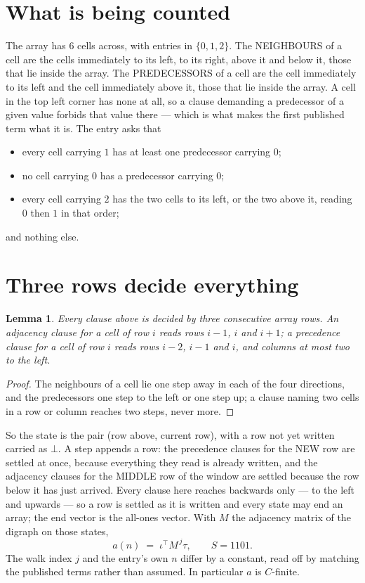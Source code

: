 \documentclass[11pt,a4paper]{article}
\theoremstyle{plain}
\newtheorem{lemma}[theorem]{Lemma}
\theoremstyle{definition}
\begin{document}
\section{What is being counted}

The array has $6$ cells across, with entries in $\{0,1,2\}$. The NEIGHBOURS of a cell are the
cells immediately to its left, to its right, above it and below it, those that lie inside the
array. The PREDECESSORS of a cell are the cell immediately to its left and the cell
immediately above it, those that lie inside the array. A cell in the top left corner has none
at all, so a clause demanding a predecessor of a given value forbids that value there --- which
is what makes the first published term what it is. The entry asks that
\begin{itemize}
\item every cell carrying $1$ has at least one predecessor carrying $0$;
\item no cell carrying $0$ has a predecessor carrying $0$;
\item every cell carrying $2$ has the two cells to its left, or the two above it, reading $0$ then $1$ in that order;
\end{itemize}
and nothing else.

\section{Three rows decide everything}

\begin{lemma}\label{lem:win}
Every clause above is decided by three consecutive array rows. An adjacency clause for a cell
of row $i$ reads rows $i-1$, $i$ and $i+1$; a precedence clause for a cell of row $i$ reads
rows $i-2$, $i-1$ and $i$, and columns at most two to the left.
\end{lemma}

\begin{proof}
The neighbours of a cell lie one step away in each of the four directions, and the predecessors
one step to the left or one step up; a clause naming two cells in a row or column reaches two
steps, never more.
\end{proof}

So the state is the pair (row above, current row), with a row not yet written carried as
$\bot$. A step appends a row: the precedence clauses for the NEW row are settled at once,
because everything they read is already written, and the adjacency clauses for the MIDDLE row
of the window are settled because the row below it has just arrived. Every clause here reaches backwards only --- to the left and upwards --- so a
row is settled as it is written and every state may end an array; the end vector is the
all-ones vector. With $M$ the
adjacency matrix of the digraph on those states,
\[
a(n)\;=\;\iota^{\!\top}M^{\,j}\tau ,\qquad S=1101.
\]
The walk index $j$ and the entry's own $n$ differ by a constant, read off by matching the
published terms rather than assumed. In particular $a$ is $C$-finite.
\end{document}
